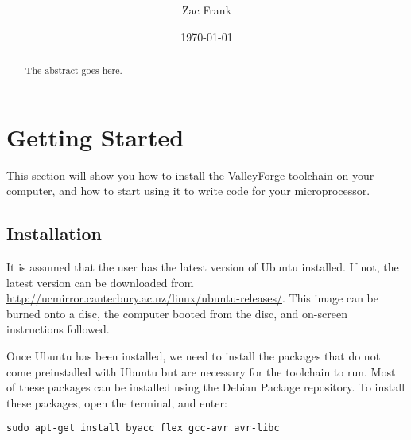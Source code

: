 \documentclass[a4paper, oneside, 11pt, titlepage, onecolumn, openright]{article}
\title{\projecttitle \\ \documenttitle}
\author{Zac Frank}
\date{\today}
\begin{document}
	\maketitle
	
	\begin{abstract}

		The abstract goes here.

	\end{abstract}

	\clearpage
	\tableofcontents

	\clearpage
	\listoffigures

	\clearpage
	\listoftables
	


	\clearpage

	\section{Getting Started}
		\label{s:Getting Started}

		This section will show you how to install the ValleyForge toolchain on your computer, and how to start using it to write code for your microprocessor.

		\subsection{Installation }
			\label{ss:Installation}

			It is assumed that the user has the latest version of Ubuntu installed. If not, the latest version can be downloaded from \url{http://ucmirror.canterbury.ac.nz/linux/ubuntu-releases/}. This image can be burned onto a disc, the computer booted from the disc, and on-screen instructions followed.
			
			Once Ubuntu has been installed, we need to install the packages that do not come preinstalled with Ubuntu but are necessary for the toolchain to run. Most of these packages can be installed using the Debian Package repository. To install these packages, open the terminal, and enter:
			
\begin{lstlisting}
sudo apt-get install byacc flex gcc-avr avr-libc
\end{lstlisting}
\end{document}
